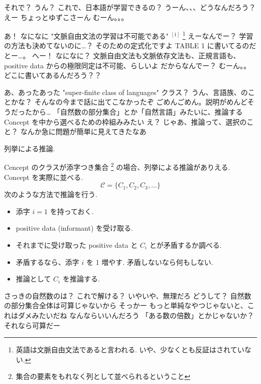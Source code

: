\PAUSE

\YUKARI それで？
\YUZUKO うん？
\YUKARI これで、日本語が学習できるの？
\YUZUKO うーん、、、どうなんだろう？
\YUKARI えー
\YUI ちょっとゆずこさーん
\YUZUKO むーん。。。

\PAUSE

\YUZUKO あ！
\YUI なになに
\YUZUKO "文脈自由文法の学習は不可能である" ${}^{[1]}$ \footnote{英語は文脈自由文法であると言われる. いや、少なくとも反証はされていない.}
\YUKARI えーなんでー？
\YUI 学習の方法も決めてないのに…？
\YUZUKO そのための定式化ですよ
\YUZUKO TABLE 1 に書いてるのだとー…。 へー！
\YUI なになに？
\YUZUKO 文脈自由文法も文脈依存文法も、正規言語も、positive data からの極限同定は不可能、らしいよ
\YUKARI だからなんでー？
\YUZUKO むーん。。
\YUZUKO どこに書いてあるんだろう？？

\PAUSE

\YUZUKO あ、あったあった
\YUZUKO "super-finite class of languages"
\YUKARI クラス？
\YUZUKO うん、言語族、のことかな？
\YUI そんなの今まで話に出てこなかったぞ
\YUZUKO ごめんごめん。説明がめんどそうだったから…
\YUZUKO 「自然数の部分集合」とか「自然言語」みたいに、推論するConcept を中から選べるための枠組みみたい
\YUKARI え？ じゃあ、推論って、選択のこと？
\YUI なんか急に問題が簡単に見えてきたなあ

\begin{boxnote}
    列挙による推論.

    Cencept のクラスが添字つき集合 \footnote{集合の要素をもれなく列として並べられるということ} の場合、列挙による推論がありえる.
    Concept を実際に並べる.
    $$\mathcal{C} = \{ C_1, C_2, C_3, \ldots \}$$
    次のような方法で推論を行う.
    \begin{itemize}
        \item
            添字 $i=1$ を持っておく.
        \item
            positive data (informant) を受け取る.
        \item
            それまでに受け取った positive data と $C_i$ とが矛盾するか調べる.
        \item
            矛盾するなら、添字 $i$ を 1 増やす.
            矛盾しないなら何もしない.
        \item
            推論として $C_i$ を推論する.
    \end{itemize}
\end{boxnote}

\YUKARI さっきの自然数のは？ これで解ける？
\YUI いやいや、無理だろ
\YUKARI どうして？
\YUI 自然数の部分集合全体は可算じゃないから
\YUKARI そっかー
\YUZUKO もっと単純なやつじゃないと、これはダメみたいだね
\YUKARI なんならいいんだろう
\YUI 「ある数の倍数」とかじゃないか？
\YUKARI それなら可算だー

